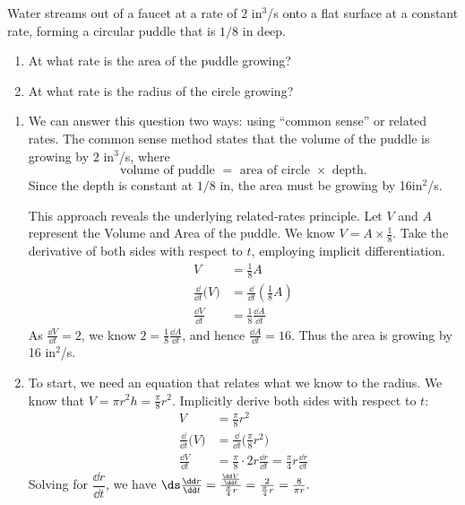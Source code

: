 \begin{example}\label{ex_rr2}%
Water streams out of a faucet at a rate of $2$ in$^3$/s onto a flat surface at a constant rate, forming a circular puddle that is $1/8$ in deep. 
\begin{enumerate}
	\item	At what rate is the area of the puddle growing?
	\item	At what rate is the radius of the circle growing?
\end{enumerate}
\solution
\begin{enumerate}
\item We can answer this question two ways: using ``common sense'' or related rates. The common sense method states that the volume of the puddle is growing by $2$ in$^3$/s, where
\[\text{volume of puddle } = \text{ area of circle } \times \text{ depth.}\]
Since the depth is constant at $1/8$ in, the area must be growing by 16in$^2$/s.

This approach reveals the underlying related-rates principle. Let $V$ and $A$ represent the Volume and Area of the puddle. We know $V= A\times \frac18$. Take the derivative of both sides with respect to $t$, employing implicit differentiation.
\begin{align*}
V &= \frac18A\\
\frac{\dd}{\dd t}\bigl(V\bigr) &= \frac{\dd}{\dd t}\left(\frac18A\right)\\
\frac{\dd V}{\dd t} &= \frac18\frac{\dd A}{\dd t}
\end{align*} 
As $\frac{\dd V}{\dd t} = 2$, we know $2 = \frac18\frac{\dd A}{\dd t}$, and hence $\frac{\dd A}{\dd t} = 16$. Thus the area is growing by 16 in$^2$/s.

\item		To start, we need an equation that relates what we know to the radius.
We know that $V=\pi r^2h=\frac\pi8r^2$.  Implicitly derive both sides with respect to $t$:
\begin{align*}
 V &= \frac\pi8 r^2 \\
 \frac{\dd}{\dd t}\bigl(V\bigr) &= \frac{\dd}{\dd t}\bigl(\frac\pi8 r^2\bigr) \\
 \frac{\dd V}{\dd t} &= \frac\pi8\cdot2r\frac{\dd r}{\dd t}=\frac\pi4 r\frac{\dd r}{\dd t}
\end{align*}
Solving for $\dfrac{\dd r}{\dd t}$, we have
$\ds
\frac{\dd r}{\dd t}=\frac{\frac{\dd V}{\dd t}}{\frac\pi4 r}
=\frac{2}{\frac\pi4 r}=\frac8{\pi r}.
$
%
%


\end{enumerate}
\end{example}
